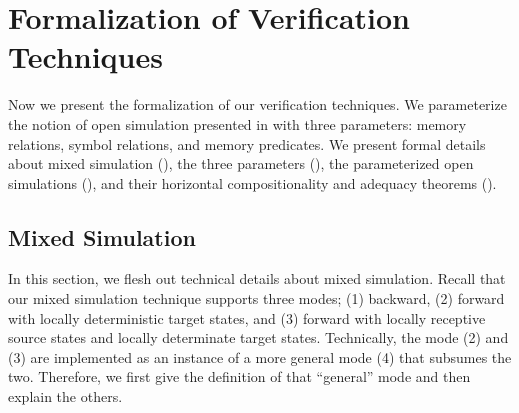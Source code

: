 \section{Formalization of Verification Techniques}
\label{sec:compiler:verification}

Now we present the formalization of our verification techniques.
We parameterize the notion of open simulation presented in
 with three parameters: memory relations, symbol
relations, and memory predicates.  We present formal details about
mixed simulation (),
the three parameters (),
the parameterized open simulations (), and
their horizontal compositionality and adequacy theorems ().

\subsection{Mixed Simulation}
\label{sec:main-verification:mixedsim}
In this section, we flesh out technical details about mixed simulation.
Recall that our mixed simulation technique supports three modes; (1) backward, (2) forward with locally deterministic target states, and (3) forward with locally receptive source states and locally determinate target states.
Technically, the mode (2) and (3) are implemented as an instance of a more general mode (4) that subsumes the two.
Therefore, we first give the definition of that ``general'' mode and then explain the others.

